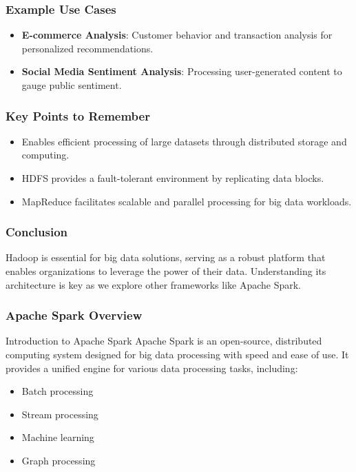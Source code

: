 \documentclass[aspectratio=169]{beamer}
\begin{document}
\begin{frame}[fragile]
    \frametitle{Example Use Cases}
    \begin{itemize}
        \item \textbf{E-commerce Analysis}: Customer behavior and transaction analysis for personalized recommendations.
        \item \textbf{Social Media Sentiment Analysis}: Processing user-generated content to gauge public sentiment.
    \end{itemize}
\end{frame}

\begin{frame}[fragile]
    \frametitle{Key Points to Remember}
    \begin{itemize}
        \item Enables efficient processing of large datasets through distributed storage and computing.
        \item HDFS provides a fault-tolerant environment by replicating data blocks.
        \item MapReduce facilitates scalable and parallel processing for big data workloads.
    \end{itemize}
\end{frame}

\begin{frame}[fragile]
    \frametitle{Conclusion}
    Hadoop is essential for big data solutions, serving as a robust platform that enables organizations to leverage the power of their data. Understanding its architecture is key as we explore other frameworks like Apache Spark.
\end{frame}

\begin{frame}[fragile]
    \frametitle{Apache Spark Overview}
    \begin{block}{Introduction to Apache Spark}
        Apache Spark is an open-source, distributed computing system designed for big data processing with speed and ease of use. It provides a unified engine for various data processing tasks, including:
    \end{block}
    \begin{itemize}
        \item Batch processing
        \item Stream processing
        \item Machine learning
        \item Graph processing
    \end{itemize}
\end{frame}
\end{document}
